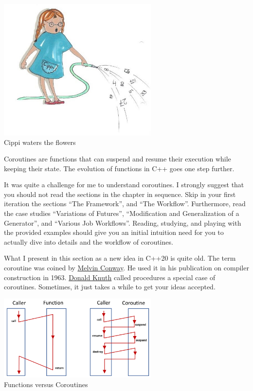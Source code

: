 \begin{center}
\includegraphics[width=0.6\textwidth]{content/3/chapter6/images/2.png}\\
Cippi waters the flowers
\end{center}

Coroutines are functions that can suspend and resume their execution while keeping their state. The evolution of functions in C++ goes one step further.

\begin{tcolorbox}[breakable,enhanced jigsaw,colback=red!5!white,colframe=red!75!black,title={The Challenge of Understanding Coroutines}]
	
It was quite a challenge for me to understand coroutines. I strongly suggest that you should not read the sections in the chapter in sequence. Skip in your first iteration the sections “The Framework”, and “The Workflow”. Furthermore, read the case studies “Variations of Futures”, “Modification and Generalization of a Generator”, and “Various Job Workflows”. Reading, studying, and playing with the provided examples should give you an initial intuition need for you to actually dive into details and the workflow of coroutines.
	
\end{tcolorbox}

What I present in this section as a new idea in C++20 is quite old. The term coroutine was coined by \href{https://en.wikipedia.org/wiki/Melvin_Conway}{Melvin Conway}. He used it in his publication on compiler construction in 1963. \href{https://en.wikipedia.org/wiki/Donald_Knuth}{Donald Knuth} called procedures a special case of coroutines. Sometimes, it just takes a while to get your ideas accepted.

\begin{center}
\includegraphics[width=0.6\textwidth]{content/3/chapter6/images/3.png}\\
Functions versus Coroutines
\end{center}

